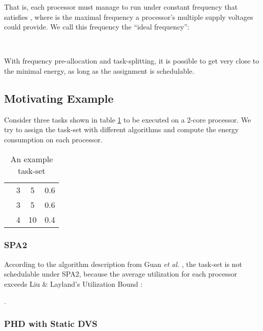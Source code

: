 \documentclass[12pt, journal,compsoc]{IEEEtran}
\begin{document}
That is, each processor must manage to run under constant frequency  that satisfies , where  is the maximal frequency a processor's multiple supply voltages could provide. We call this frequency the ``ideal frequency'':
\begin{center}
\\
\end{center}

With frequency pre-allocation and task-splitting, it is possible to get very close to the minimal energy, as long as the assignment is schedulable.

\subsection{Motivating Example}

Consider three tasks shown in table \ref{edata} to be executed on a 2-core processor. We try to assign the task-set with different algorithms and compute the energy consumption on each processor.

\begin{table}[!t]
\caption{An example task-set}\label{edata}
\centering
\begin{tabular}{|c||c|c|c|}

\hline
&  &  & \\
\hline
 & 3 & 5 & 0.6\\
\hline
 & 3 & 5 & 0.6\\
\hline
 & 4 & 10 & 0.4\\
\hline
\end{tabular}
\end{table}



\subsubsection{SPA2}

According to the algorithm description from Guan \emph{et al.} \cite{Guan:2010:FMS:1828428.1829220}, the task-set is not schedulable under SPA2, because the average utilization for each processor exceeds Liu \& Layland's Utilization Bound \cite{Liu:1973:SAM:321738.321743}:

\begin{center}
.
\end{center}


\subsubsection{PHD with Static DVS}
\end{document}
